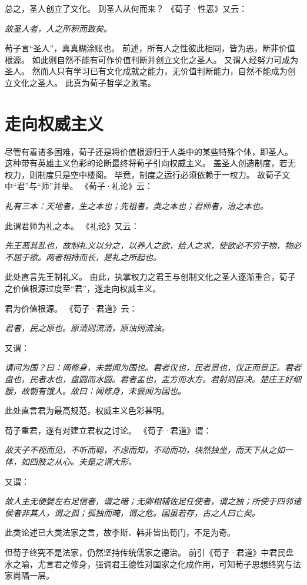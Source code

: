 \documentclass[11pt]{article}
\begin{document}
总之，圣人创立了文化。
则圣人从何而来？
《荀子·性恶》又云：

\textit{故圣人者，人之所积而致矣。}

荀子言“圣人”，真真糊涂账也。
前述，所有人之性彼此相同，皆为恶，断非价值根源。
如此则自然不能有可作价值判断并创立文化之圣人。
又谓人经努力可成为圣人。
然而人只有学习已有文化成就之能力，无价值判断能力，自然不能成为创立文化之圣人。
此真为荀子哲学之败笔。

\section{走向权威主义}
尽管有着诸多困难，荀子还是将价值根源归于人类中的某些特殊个体，即圣人。
这种带有英雄主义色彩的论断最终将荀子引向权威主义。
盖圣人创造制度，若无权力，则制度只是空中楼阁。
毕竟，制度之运行必须依赖于一权力。
故荀子文中“君”与“师”并举。
《荀子·礼论》云：

\textit{礼有三本：天地者，生之本也；先祖者，类之本也；君师者，治之本也。}

此谓君师为礼之本。
《礼论》又云：

\textit{先王恶其乱也，故制礼义以分之，以养人之欲，给人之求，使欲必不穷于物，物必不屈于欲。两者相持而长，是礼之所起也。}

此处直言先王制礼义。
由此，执掌权力之君王与创制文化之圣人逐渐重合，荀子之价值根源过度至“君”，遂走向权威主义。

\newline

君为价值根源。
《荀子·君道》云：

\textit{君者，民之原也。原清则流清，原浊则流浊。}

又谓：

\textit{请问为国？曰：闻修身，未尝闻为国也。君者仪也，民者景也，仪正而景正。君者盘也，民者水也，盘圆而水圆。君者盂也，盂方而水方。君射则臣决。楚庄王好细腰，故朝有饿人。故曰：闻修身，未尝闻为国也。}

此处直言君为最高规范，权威主义色彩甚明。

\newline

荀子重君，遂有对建立君权之讨论。
《荀子·君道》谓：

\textit{故天子不视而见，不听而聪，不虑而知，不动而功，块然独坐，而天下从之如一体，如四肢之从心。夫是之谓大形。}

又谓：

\textit{故人主无便嬖左右足信者，谓之暗；无卿相辅佐足任使者，谓之独；所使于四邻诸侯者非其人，谓之孤；孤独而晻，谓之危。国虽若存，古之人曰亡矣。}

此类论述已大类法家之言，故李斯、韩非皆出荀门，不足为奇。

\newline

但荀子终究不是法家，仍然坚持传统儒家之德治。
前引《荀子·君道》中君民盘水之喻，尤言君之修身，强调君王德性对国家之化成作用，可知荀子思想终究与法家尚隔一层。
\end{document}
